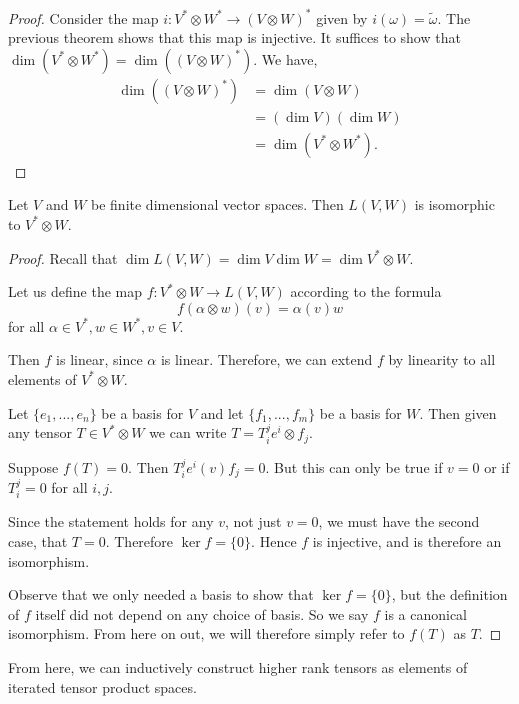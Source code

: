 \begin{proof}
    Consider the map $i : V^* \otimes W^* \to (V\otimes W)^*$ given by $i(\omega) = \tilde{\omega}$. The previous theorem shows that this map is injective. It suffices to show that $\dim(V^* \otimes W^*) = \dim((V\otimes W)^*)$. We have, 
    \begin{align*}\dim((V\otimes W)^*) &= \dim(V\otimes W) \\&= (\dim V)(\dim W)\\& = \dim(V^* \otimes W^*).\end{align*} 
\end{proof}
\begin{thm}
    Let $V$ and $W$ be finite dimensional vector spaces. Then $L(V,W)$ is isomorphic to $V^*\otimes W$.
\end{thm}
\begin{proof} Recall that $\dim L(V,W) =\dim V \dim W =  \dim V^* \otimes W$.

Let us define the map $f : V^*\otimes W \to L(V,W)$ according to the formula 
\[f(\alpha\otimes w)(v) = \alpha(v)w\]
for all $\alpha\in V^*, w\in W^*, v\in V$.

Then $f$ is linear, since $\alpha$ is linear. Therefore, we can extend $f$ by linearity to all elements of $V^*\otimes W$.

Let $\{e_1,...,e_n\}$ be a basis for $V$ and let $\{f_1,...,f_m\}$ be a basis for $W$. Then given any tensor $T\in V^*\otimes W$ we can write $T = T_i^j e^i\otimes f_j$.

Suppose $f(T) = 0$. Then $T_i^j e^i(v)f_j = 0$. But this can only be true if $v=0$ or if $T_i^j = 0$ for all $i,j$. 

Since the statement holds for any $v$, not just $v=0$, we must have the second case, that $T=0$. Therefore $\ker f = \{0\}$. Hence $f$ is injective, and is therefore an isomorphism.

Observe that we only needed a basis to show that $\ker f = \{0\}$, but the definition of $f$ itself did not depend on any choice of basis. So we say $f$ is a canonical isomorphism.
From here on out, we will therefore simply refer to $f(T)$ as $T$.
\end{proof}

From here, we can inductively construct higher rank tensors as elements of iterated tensor product spaces.
